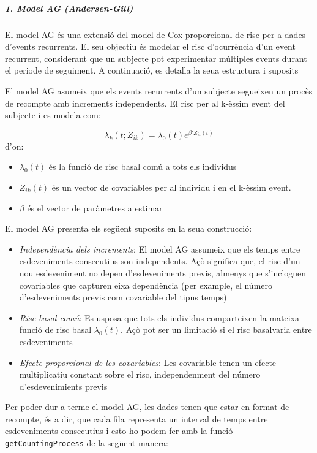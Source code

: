 \documentclass[
]{article}
\providecommand{\tightlist}{%
  \setlength{\itemsep}{0pt}\setlength{\parskip}{0pt}}
\begin{document}
\subparagraph{1. Model AG (Andersen-Gill)}\label{model-ag-andersen-gill}

El model AG és una extensió del model de Cox proporcional de risc per a
dades d'events recurrents. El seu objectiu és modelar el risc
d'ocurrència d'un event recurrent, considerant que un subjecte pot
experimentar múltiples events durant el periode de seguiment. A
continuació, es detalla la seua estructura i suposits

El model AG asumeix que els events recurrents d'un subjecte segueixen un
procès de recompte amb increments independents. El risc per al k-èssim
event del subjecte i es modela com:

\[
\lambda_k(t;Z_{ik}) = \lambda_0(t) e^{\beta'Z_{it}(t)}
\] d'on:

\begin{itemize}
\tightlist
\item
  \(\lambda_0(t)\) és la funció de risc basal comú a tots els individus
\item
  \(Z_{ik}(t)\) és un vector de covariables per al individu i en el
  k-èssim event.
\item
  \(\beta\) és el vector de paràmetres a estimar
\end{itemize}

El model AG presenta els següent suposits en la seua construcció:

\begin{itemize}
\item
  \emph{Independència dels increments}: El model AG assumeix que els
  temps entre esdeveniments consecutius son independents. Açò significa
  que, el risc d'un nou esdeveniment no depen d'esdeveniments previs,
  almenys que s'incloguen covariables que capturen eixa dependència (per
  example, el número d'esdeveniments previs com covariable del tipus
  temps)
\item
  \emph{Risc basal comú}: Es usposa que tots els individus comparteixen
  la mateixa funció de risc basal \(\lambda_0(t)\). Açò pot ser un
  limitació si el risc basalvaria entre esdeveniments
\item
  \emph{Efecte proporcional de les covariables}: Les covariable tenen un
  efecte multiplicatiu constant sobre el risc, independenment del número
  d'esdevenimients previs
\end{itemize}

Per poder dur a terme el model AG, les dades tenen que estar en format
de recompte, és a dir, que cada fila representa un interval de temps
entre esdeveniments consecutius i esto ho podem fer amb la funció
\texttt{getCountingProcess} de la següent manera:
\end{document}
